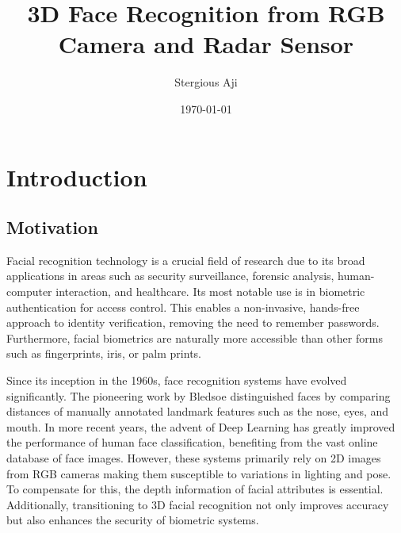 \documentclass{interim}
\begin{document}
\title{3D Face Recognition from RGB Camera and Radar Sensor}
\author{Stergious Aji}
\date{\today}
\maketitle

{\hypersetup{hidelinks}\tableofcontents}
\newpage

\section{Introduction}\label{intro}

\subsection{Motivation}
Facial recognition technology is a crucial field of research due to its broad applications in areas such as security surveillance, forensic analysis, human-computer interaction, and healthcare. Its most notable use is in biometric authentication for access control. This enables a non-invasive, hands-free approach to identity verification, removing the need to remember passwords. Furthermore, facial biometrics are naturally more accessible than other forms such as fingerprints, iris, or palm prints.

Since its inception in the 1960s, face recognition systems have evolved significantly. The pioneering work by Bledsoe \cite{bledsoe1966model} distinguished faces by comparing distances of manually annotated landmark features such as the nose, eyes, and mouth. In more recent years, the advent of Deep Learning has greatly improved the performance of human face classification, benefiting from the vast online database of face images.  However, these systems primarily rely on 2D images from RGB cameras making them susceptible to variations in lighting and pose. To compensate for this, the depth information of facial attributes is essential. Additionally, transitioning to 3D facial recognition not only improves accuracy but also enhances the security of biometric systems.
\end{document}
